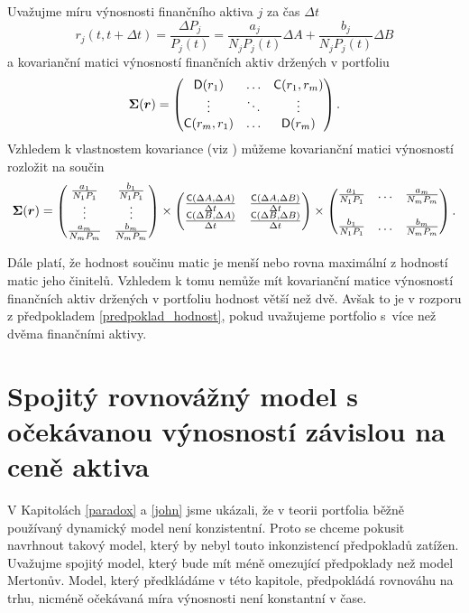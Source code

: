 \documentclass[a4paper,12pt]{report}
\theoremstyle{definition} \newtheorem{definice}[veta]{Definice}
\theoremstyle{remark}
\begin{document}
Uvažujme míru výnosnosti finančního aktiva $j$ za čas $\Delta t$
\begin{displaymath}
r_j(t,t+\Delta t)=\frac{\Delta P_j}{P_j(t)}=\frac{a_j}{N_jP_j(t)}\Delta A + \frac{b_j}{N_jP_j(t)}\Delta B
\end{displaymath}
a kovarianční matici výnosností finančních aktiv držených v portfoliu
$$\boldsymbol{\Sigma}(\boldsymbol{r})=
\begin{pmatrix}
\mathsf{D}(r_1)  & \ldots & \mathsf{C}(r_1,r_m)  \cr \vdots & \ddots & \vdots\cr \mathsf{C}(r_m,r_1)   & \ldots & \mathsf{D}(r_m) 
\end{pmatrix}.$$
Vzhledem k vlastnostem kovariance (viz \cite{andel}) můžeme kovarianční matici výnosností rozložit na součin 
$$
\boldsymbol{\Sigma}(\boldsymbol{r})= 
\begin{pmatrix}
\frac{a_1}{N_1P_1} & \frac{b_1}{N_1P_1}\cr \vdots & \vdots\cr \frac{a_m}{N_mP_m} & \frac{b_m}{N_mP_m}
\end{pmatrix}
\times
\begin{pmatrix}
\frac{\mathsf{C}(\Delta A, \Delta A)}{\Delta t} &
\frac{\mathsf{C}(\Delta A, \Delta B)}{\Delta t} \cr
\frac{\mathsf{C}(\Delta B, \Delta A)}{\Delta t} & \frac{\mathsf{C}(\Delta B,
\Delta B)}{\Delta t} 
\end{pmatrix}
\times
\begin{pmatrix}
\frac{a_1}{N_1P_1} & \ldots & \frac{a_m}{N_mP_m}\cr \cr \frac{b_1}{N_1P_1} & \ldots &
\frac{b_m}{N_mP_m}
\end{pmatrix}.
$$

Dále platí, že hodnost součinu matic je menší nebo rovna maximální z hodností matic jeho činitelů.
Vzhledem k tomu nemůže mít kovarianční matice výnosností finančních aktiv držených v portfoliu hodnost větší než dvě.
Avšak to je v rozporu z předpokladem \ref{predpoklad_hodnost}, pokud uvažujeme portfolio s~více než dvěma finančními aktivy.


\section{Spojitý rovnovážný model s očekávanou výnosností závislou na ceně aktiva}\label{muj_model}
V Kapitolách \ref{paradox} a \ref{john} jsme ukázali, že v teorii portfolia běžně používaný dynamický model není konzistentní.
Proto se chceme pokusit navrhnout takový model, který by nebyl touto inkonzistencí předpokladů zatížen.
Uvažujme spojitý model, který bude mít méně omezující předpoklady než model Mertonův.
Model, který předkládáme v této kapitole, předpokládá rovnováhu na trhu, nicméně očekávaná míra výnosnosti není konstantní v čase.
\end{document}
